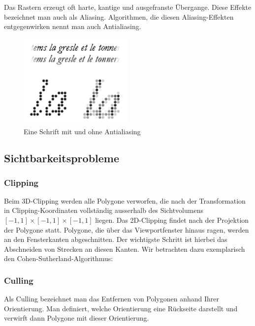 Das Rastern erzeugt oft harte, kantige und ausgefranste Übergange. Diese Effekte bezeichnet man auch als Aliasing. Algorithmen, die diesen Aliasing-Effekten entgegenwirken nennt man auch 
Antialiasing. 
\begin{figure}[H]
    \centering
    \includegraphics[width=0.5\textwidth]{images/Antialiasing.png}
    \caption{Eine Schrift mit und ohne Antialiasing}
    \label{fig:gimbal+lock}
\end{figure}


\subsection*{Sichtbarkeitsprobleme}

\subsubsection*{Clipping}
Beim 3D-Clipping werden alle Polygone verworfen, die nach der Transformation in Clipping-Koordinaten vollständig ausserhalb des Sichtvolumens
$[-1,1] \times [-1,1] \times [-1,1] $ liegen. Das 2D-Clipping findet nach der Projektion der Polygone statt. Polygone, die über das Viewportfenster hinaus ragen, werden an den Fensterkanten abgeschnitten.
Der wichtigste Schritt ist hierbei das Abschneiden von Strecken an diesen Kanten. Wir betrachten dazu exemplarisch den Cohen-Sutherland-Algorithmus:

\begin{Algorithmus}
\end{Algorithmus}

\subsubsection*{Culling}
Als Culling bezeichnet man das Entfernen von Polygonen anhand Ihrer Orientierung. Man definiert, welche Orientierung eine Rückseite darstellt und verwirft dann Polygone mit dieser Orientierung.

